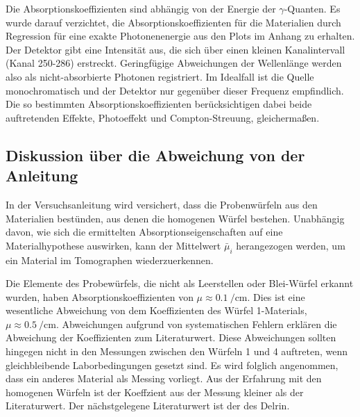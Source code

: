 Die Absorptionskoeffizienten sind abhängig von der Energie der $\gamma$-Quanten.
Es wurde darauf verzichtet, die Absorptionskoeffizienten für die Materialien durch
Regression für eine exakte Photonenenergie aus den Plots im Anhang zu erhalten.
Der Detektor gibt eine Intensität aus, die sich über einen kleinen Kanalintervall
(Kanal 250-286) erstreckt. Geringfügige Abweichungen der Wellenlänge werden also
als nicht-absorbierte Photonen registriert.
Im Idealfall ist die Quelle monochromatisch und der Detektor nur gegenüber dieser
Frequenz empfindlich. Die so bestimmten Absorptionskoeffizienten berücksichtigen
dabei beide auftretenden Effekte, Photoeffekt und Compton-Streuung, gleichermaßen.

\subsection{Diskussion über die Abweichung von der Anleitung}
\label{sec:Diskussion3}
In der Versuchsanleitung wird versichert, dass die Probenwürfeln aus den Materialien
bestünden, aus denen die homogenen Würfel bestehen.
Unabhängig davon, wie sich die ermittelten Absorptionseigenschaften auf eine Materialhypothese
auswirken, kann der Mittelwert $\bar\mu_i$ herangezogen werden, um ein Material
im Tomographen wiederzuerkennen.

Die Elemente des Probewürfels, die nicht als Leerstellen oder Blei-Würfel erkannt
wurden, haben Absorptionskoeffizienten von  $\mu\approx\SI{0.1}{\per\centi\meter}$.
Dies ist eine wesentliche Abweichung von dem Koeffizienten des Würfel 1-Materials,
$\mu\approx\SI{0.5}{\per\centi\meter}$.
Abweichungen aufgrund von systematischen Fehlern erklären die Abweichung der
Koeffizienten zum Literaturwert. Diese Abweichungen sollten hingegen nicht in den
Messungen zwischen den Würfeln 1 und 4 auftreten, wenn gleichbleibende
Laborbedingungen gesetzt sind. Es wird folglich angenommen, dass ein anderes Material
als Messing vorliegt.
Aus der Erfahrung mit den homogenen Würfeln ist der Koeffzient aus der Messung
kleiner als der Literaturwert. Der nächstgelegene Literaturwert ist der des Delrin.
